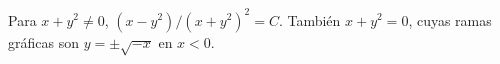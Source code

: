 Para $x+y^2\ne0$, $(x-y^2)/(x+y^2)^2=C$. También $x+y^2=0$, cuyas ramas gráficas son $y=\pm\sqrt{-x}$ en $x<0$.
